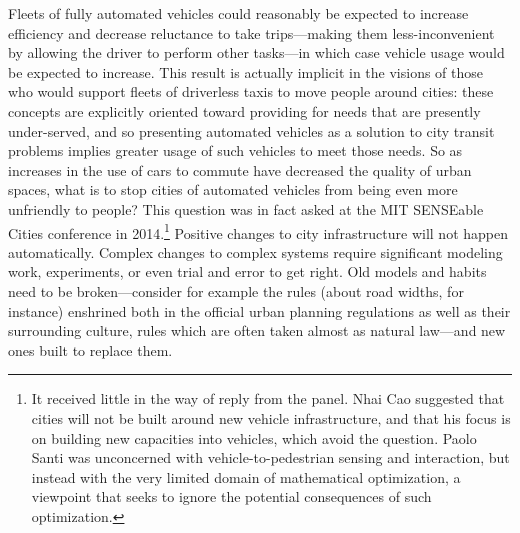 Fleets of fully automated vehicles could reasonably be expected to increase
efficiency and decrease reluctance to take trips---making them
less-inconvenient by allowing the driver to perform other tasks---in
which case vehicle usage would be expected to increase. This result is actually
implicit in the visions of those who would support fleets of
driverless taxis to move people around cities:  these concepts are
explicitly oriented toward providing for needs that are presently
under-served, and so presenting automated vehicles as a solution to
city transit problems implies greater usage of such vehicles to meet
those needs. So as increases in the use of cars to commute have
decreased the quality of urban spaces, what is to stop cities of
automated vehicles from
being even more unfriendly to
people? This question was in fact asked at the MIT SENSEable Cities
conference in 2014.\footnote{It received little in the way of reply from the
panel. Nhai Cao suggested that cities will not be built around new
vehicle infrastructure, and that his focus is on building new
capacities into vehicles, which avoid the question. Paolo Santi was
unconcerned with vehicle-to-pedestrian sensing and interaction, but
instead with the very limited domain of mathematical optimization,
a viewpoint that seeks to ignore the potential consequences of such
optimization.} Positive changes to city infrastructure will not happen
automatically. Complex
changes to complex systems require significant modeling work,
experiments, or even trial and error to get right. Old models and
habits need to be broken---consider for example the rules (about road
widths, for instance) enshrined
both in the official urban planning regulations as well as their
surrounding culture, rules which are often taken almost as natural
law\cite{???-kemp}---and new ones built to replace them. 


